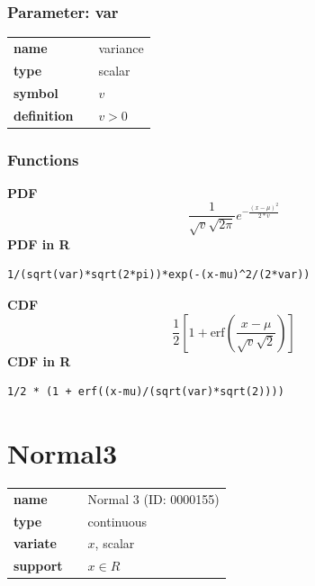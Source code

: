 \documentclass{article}
\begin{document}
\subsubsection*{Parameter: var}

\noindent\begin{tabular}{p{2cm}cl}
\textbf{name} & & variance \\
\textbf{type} & & scalar \\
\textbf{symbol} & & $v$  \\
\textbf{definition} & & $v>0$
\end{tabular}
\subsubsection*{Functions}

\smallskip \noindent \hspace{.2cm} \textbf{PDF} 
\begin{equation*}\frac{1}{\sqrt{v} \sqrt{2 \pi}}e^{-\frac{(x-\mu)^2}{2*v}}\end{equation*}
\smallskip \noindent \hspace{.2cm} \textbf{PDF in R}  
\begin{verbatim}1/(sqrt(var)*sqrt(2*pi))*exp(-(x-mu)^2/(2*var))\end{verbatim}
\smallskip \noindent \hspace{.2cm} \textbf{CDF} 
\begin{equation*}\frac12\left[1 + \text{erf}\left( \frac{x-\mu}{\sqrt{v}\sqrt{2}}\right)\right]\end{equation*}
\smallskip \noindent \hspace{.2cm} \textbf{CDF in R} 
\begin{verbatim}1/2 * (1 + erf((x-mu)/(sqrt(var)*sqrt(2))))\end{verbatim}
\smallskip\section*{Normal3} 

  \bigskip 

\begin{tabular}{p{2cm}cl}
\textbf{name} & & Normal 3 (ID: 0000155)\\ 
 
\textbf{type} & & continuous \\ 

\textbf{variate} & & $x$, scalar \\ 

\textbf{support} & & $x \in R$
\end{tabular}
\end{document}
